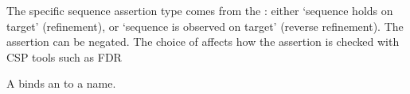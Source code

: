 The specific sequence assertion type comes from the \msequenceassertiontype:
either `sequence holds on target' (refinement), or `sequence is observed on
target' (reverse refinement).  The assertion can be negated.  The choice of
\mcspmodel{} affects how the assertion is checked with CSP tools such as FDR

A \mnamedassertion{} binds an \massertion{} to a name.
